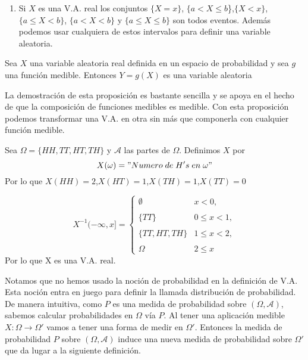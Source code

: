         \begin{observacion}
        \begin{enumerate}
            \item Si $X$ es una V.A. real los conjuntos $\{X = x\}$, $\{a < X \leq b$\},${\{X < x\}}$,$\{a \leq X < b\}$, $\{a < X < b\}$ y $\{a \leq X \leq b\}$ son todos eventos. Además podemos usar cualquiera de estos intervalos para definir una variable aleatoria.
        \end{enumerate}
        \end{observacion}
    
        \begin{proposicion}
        Sea $X$ una variable aleatoria real definida en un espacio de probabilidad y sea $g$ una función medible. Entonces $Y=g(X)$ es una variable aleatoria
        \end{proposicion}
        
        La demostración de esta proposición es bastante sencilla y se apoya en el hecho de que la composición de funciones medibles es medible. Con esta proposición podemos transformar una V.A. en otra sin más que componerla con cualquier función medible. 
    
        \begin{ejemplo}
        Sea $\Omega = \{ HH,TT,HT,TH \}$ y $\mathcal{A}$ las partes de $\Omega$. Definimos $X$ por
        $$X(\omega) = "Numero \; de \; H's \; en \; \omega"$$
        Por lo que $X(HH) = 2$,$X(HT)=1$,$X(TH)=1$,$X(TT)=0$
        
        $$ X^{-1}(-\infty,x] = \left\{ 
        \begin{array}{lcc} 
                \emptyset &   x<0, \\
                \\ \{TT\}  & 0 \leq  x < 1, \\
                \\ \{TT,HT,TH\} & 1 \leq x < 2, \\
                \\ \Omega & 2 \leq x
        \end{array} \right. $$
        Por lo que X es una V.A. real. 
        \end{ejemplo}
    
    Notamos que no hemos usado la noción de probabilidad en la definición de V.A. Esta noción entra en juego para definir la llamada distribución de probabilidad. De manera intuitiva, como $P$ es una medida de probabilidad sobre $(\Omega, \mathcal{A})$, sabemos calcular probabilidades en $\Omega$ vía $P$. Al tener una aplicación medible $X:\Omega \to \Omega'$ vamos a tener una forma de medir en $\Omega'$. Entonces la medida de probabilidad $P$ sobre $(\Omega, \mathcal{A})$ induce una nueva medida de probabilidad sobre $\Omega'$ que da lugar a la siguiente definición. \\
    

